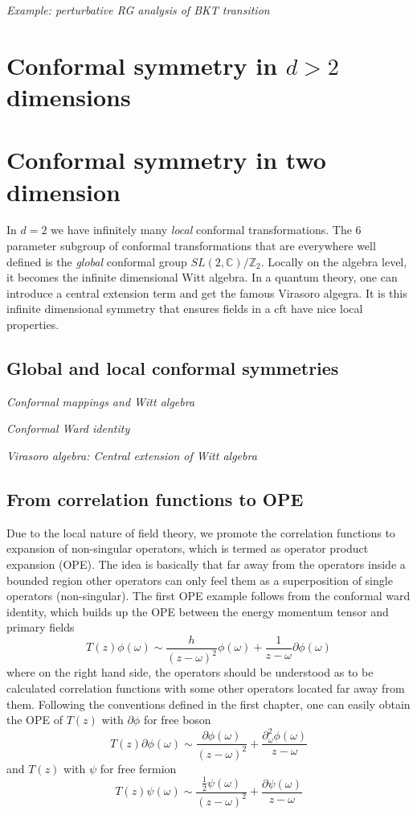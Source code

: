 \documentclass[submission, PhysLectNotes]{SciPost}
\begin{document}
{\it Example: perturbative RG analysis of BKT transition}

\section{Conformal symmetry in $d>2$ dimensions}

\section{Conformal symmetry in two dimension}
In $d=2$ we have infinitely many \emph{local} conformal transformations. The 6 parameter subgroup of conformal transformations that are everywhere well defined is the \emph{global} conformal group $SL(2,\mathbb{C})/\mathbb{Z}_2$. Locally on the algebra level, it becomes the infinite dimensional Witt algebra. In a quantum theory, one can introduce a central extension term and get the famous Virasoro algegra. It is this infinite dimensional symmetry that ensures fields in a cft have nice local properties. 

\subsection{Global and local conformal symmetries}

{\it Conformal mappings and Witt algebra}

{\it Conformal Ward identity}

{\it Virasoro algebra: Central extension of Witt algebra}

\subsection{From correlation functions to OPE}
Due to the local nature of field theory, we promote the correlation functions to expansion of non-singular operators, which is termed as operator product expansion (OPE). The idea is basically that far away from the operators inside a bounded region other operators can only feel them as a superposition of single operators (non-singular). The first OPE example follows from the conformal ward identity, which builds up the OPE between the energy momentum tensor and primary fields
\begin{equation}
	T(z) \phi(\omega) \sim \frac{h}{\left(z-\omega\right)^2} \phi(\omega) + \frac{1}{z-\omega} \partial \phi(\omega)
\end{equation}
where on the right hand side, the operators should be understood as to be calculated correlation functions with some other operators located far away from them.  Following the conventions defined in the first chapter, one can easily obtain the OPE of $T(z)$ with $\partial \phi$ for free boson
\begin{equation}
T(z) \partial\phi(\omega) \sim \frac{\partial \phi(\omega)}{\left(z-\omega\right)^2} + \frac{\partial_\omega^2 \phi(\omega)}{z-\omega}
\end{equation}
and $T(z)$ with $\psi$ for free fermion 
\begin{equation}
T(z) \psi(\omega) \sim \frac{\frac{1}{2} \psi(\omega)}{\left(z-\omega\right)^2} + \frac{\partial \psi(\omega)}{z-\omega}
\end{equation}
\end{document}

